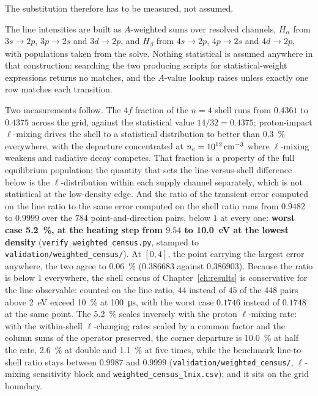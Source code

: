The substitution therefore has to be measured, not assumed.

The line intensities are built as $A$-weighted sums over resolved channels,
$H_\alpha$ from $3s\to2p$, $3p\to2s$ and $3d\to2p$, and $H_\beta$ from
$4s\to2p$, $4p\to2s$ and $4d\to2p$, with populations taken from the solve.
Nothing statistical is assumed anywhere in that construction: searching the two
producing scripts for statistical-weight expressions returns no matches, and the
$A$-value lookup raises unless exactly one row matches each transition.

Two measurements follow. The $4f$ fraction of the $n=4$ shell runs from
$0.4361$ to $0.4375$ across the grid, against the statistical value
$14/32 = 0.4375$; proton-impact $\ell$-mixing drives the shell to a statistical
distribution to better than \SI{0.3}{\percent} everywhere, with the departure
concentrated at $n_e = \SI{e12}{\per\cubic\centi\metre}$ where $\ell$-mixing
weakens and radiative decay competes. That fraction is a property of the full
equilibrium population; the quantity that sets the line-versus-shell difference
below is the $\ell$-distribution within each supply channel separately, which
is not statistical at the low-density edge. And the ratio of the transient error
computed on the line ratio to the same error computed on the shell ratio runs
from $0.9482$ to $0.9999$ over the $784$ point-and-direction pairs, below $1$ at
every one: \textbf{worst case \SI{5.2}{\percent}, at the heating step from
$9.54$ to \SI{10.0}{\electronvolt} at the lowest density}
(\texttt{verify\_weighted\_census.py}, stamped to
\texttt{validation/weighted\_census/}). At
$[0,4]$, the point carrying the largest error anywhere, the two agree to
\SI{0.06}{\percent} ($0.386683$ against $0.386903$). Because the ratio is below
$1$ everywhere, the shell census of Chapter~\ref{ch:results} is conservative
for the line observable: counted on the line ratio, $44$ instead of $45$ of the
$448$ pairs above \SI{2}{\electronvolt} exceed \SI{10}{\percent} at
\SI{100}{\micro\second}, with the worst case $0.1746$ instead of $0.1748$ at
the same point. The \SI{5.2}{\percent} scales inversely with the proton
$\ell$-mixing rate: with the within-shell $\ell$-changing rates scaled by a
common factor and the column sums of the operator preserved, the corner
departure is \SI{10.0}{\percent} at half the rate, \SI{2.6}{\percent} at double
and \SI{1.1}{\percent} at five times, while the benchmark line-to-shell ratio
stays between $0.9987$ and $0.9999$ (\texttt{validation/weighted\_census/},
$\ell$-mixing sensitivity block and \texttt{weighted\_census\_lmix.csv}); and
it sits on the grid boundary.

